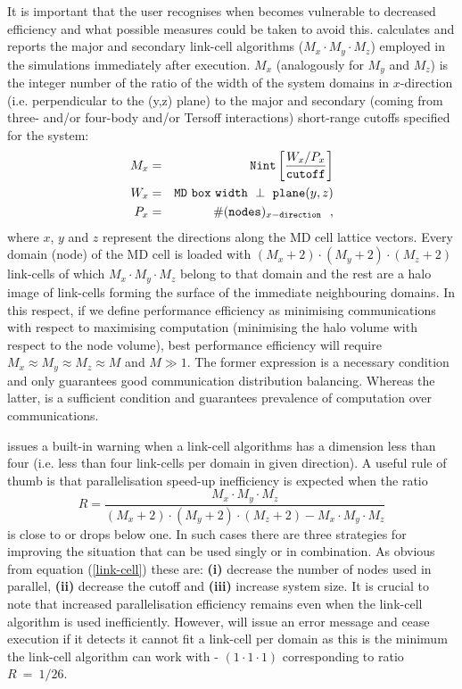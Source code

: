 It is important that the user recognises when \D becomes
vulnerable to decreased efficiency and what possible measures
could be taken to avoid this.  \D calculates and reports the
major and secondary link-cell algorithms ($M_{x} \cdot M_{y} \cdot M_{z}$)
employed in the simulations immediately after execution.  $M_{x}$
(analogously for $M_{y}$ and $M_{z}$) is the integer number of the
ratio of the width of the system domains in $x$-direction (i.e.
perpendicular to the (y,z) plane) to the major and secondary
(coming from three- and/or four-body and/or Tersoff interactions)
short-range cutoffs specified for the system:
\begin{eqnarray}
M_{x} &=& {\tt Nint} \left[ \frac{W_{x}/P_{x}}{\tt cutoff} \right] \nonumber \\
W_{x} &=& {\tt MD~box~width~\perp~plane}(y,z) \label{link-cell} \\
P_{x} &=& \#({\tt nodes})_{x{\tt -direction}}~~, \nonumber
\end{eqnarray}
where $x$, $y$ and $z$ represent the directions along the MD cell
lattice vectors.  Every domain (node) of the MD cell is loaded with
$(M_{x}+2) \cdot (M_{y}+2) \cdot (M_{z}+2)$ link-cells of which
$M_{x} \cdot M_{y} \cdot M_{z}$ belong to that domain and the rest
are a halo image of link-cells forming the surface of the
immediate neighbouring domains.  In this respect, if we define
performance efficiency as minimising communications with respect
to maximising computation (minimising the halo volume with respect
to the node volume), best performance efficiency will require
$M_{x} \approx M_{y} \approx M_{z} \approx M$ and $M \gg 1$.
The former expression is a necessary condition and only guarantees
good communication distribution balancing.  Whereas the latter, is
a sufficient condition and guarantees prevalence of computation over
communications.

\D issues a built-in warning when a link-cell algorithms has a
dimension less than four (i.e. less than four link-cells per
domain in given direction).  A useful rule of thumb is that
parallelisation speed-up inefficiency is expected when the ratio
\begin{equation}
R = \frac{M_{x} \cdot M_{y} \cdot M_{z}}{(M_{x}+2)
\cdot (M_{y}+2) \cdot (M_{z}+2)-M_{x} \cdot M_{y} \cdot M_{z}} \label{R-factor}
\end{equation}
is close to or drops below one.  In such cases there are three
strategies for improving the situation that can be used singly or in
combination.  As obvious from equation (\ref{link-cell}) these are:
{\bf (i)} decrease the number of nodes used in parallel, {\bf (ii)}
decrease the cutoff and {\bf (iii)} increase system size.  It is
crucial to note that increased parallelisation efficiency remains
even when the link-cell algorithm is used inefficiently.  However,
\D will issue an error message and cease execution if it detects it
cannot fit a link-cell per domain as this is the minimum the \D
link-cell algorithm can work with - $(1 \cdot 1 \cdot 1)$
corresponding to ratio $R~=~1/26$.

